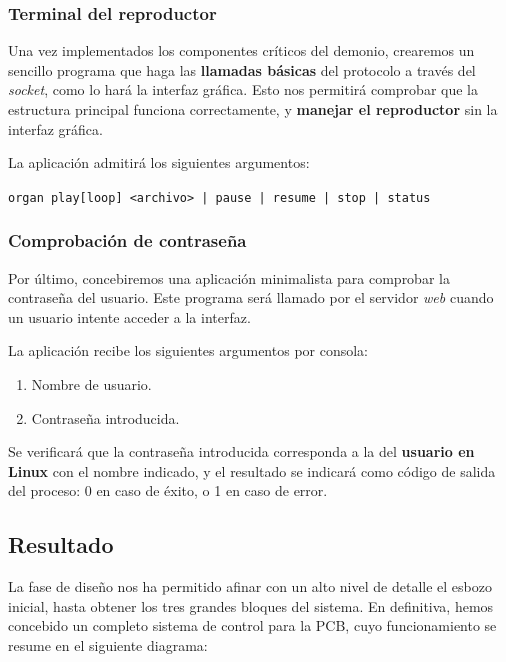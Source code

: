 \documentclass[10pt,a4paper]{article}
\begin{document}
	\subsubsection*{Terminal del reproductor}
	
	Una vez implementados los componentes críticos del demonio, crearemos un sencillo programa que haga las \textbf{llamadas básicas} del protocolo a través del \textit{socket}, como lo hará la interfaz gráfica. Esto nos permitirá comprobar que la estructura principal funciona correctamente, y \textbf{manejar el reproductor} sin la interfaz gráfica.
	
	La aplicación admitirá los siguientes argumentos:
	
	\begin{center}
		\verb!organ play[loop] <archivo> | pause | resume | stop | status !
	\end{center}
	
	\subsubsection*{Comprobación de contraseña}
	
	Por último, concebiremos una aplicación minimalista para comprobar la contraseña del usuario. Este programa será llamado por el servidor \textit{web} cuando un usuario intente acceder a la interfaz.
	
	La aplicación recibe los siguientes argumentos por consola:
	
	\begin{enumerate}
		\item Nombre de usuario.
		\item Contraseña introducida.
	\end{enumerate}
	
	Se verificará que la contraseña introducida corresponda a la del \textbf{usuario en Linux} con el nombre indicado, y el resultado se indicará como código de salida del proceso: 0 en caso de éxito, o 1 en caso de error.
	
	\subsection{Resultado}
	
	La fase de diseño nos ha permitido afinar con un alto nivel de detalle el esbozo inicial, hasta obtener los tres grandes bloques del sistema. En definitiva, hemos concebido un completo sistema de control para la PCB, cuyo funcionamiento se resume en el siguiente diagrama:
	
\end{document}
